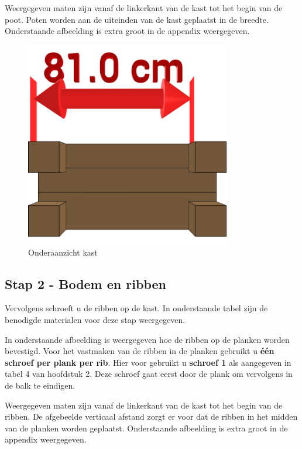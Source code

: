 \documentclass{article}
\begin{document}
Weergegeven maten zijn vanaf de linkerkant van de kast tot het begin van de poot. Poten worden aan de uiteinden van de kast geplaatst in de breedte. Onderstaande afbeelding is extra groot in de appendix weergegeven.

\begin{figure}[h!]
    \centering
    \includegraphics[width=0.8\textwidth]{scene 1 - bottom.png}
    \caption{Onderaanzicht kast}
    \label{fig:stap 1}
\end{figure}

\clearpage
\newpage

\subsection{Stap 2 - Bodem en ribben}

Vervolgens schroeft u de ribben op de kast. In onderstaande tabel zijn de benodigde materialen voor deze stap weergegeven.



In onderstaande afbeelding is weergegeven hoe de ribben op de planken worden bevestigd. Voor het vastmaken van de ribben in de planken gebruikt u \textbf{\'{e}\'{e}n schroef per plank per rib}. Hier voor gebruikt u \textbf{schroef 1} als aangegeven in tabel 4 van hoofdstuk 2. Deze schroef gaat eerst door de plank om vervolgens in de balk te eindigen.

Weergegeven maten zijn vanaf de linkerkant van de kast tot het begin van de ribben. De afgebeelde verticaal afstand zorgt er voor dat de ribben in het midden van de planken worden geplaatst. Onderstaande afbeelding is extra groot in de appendix weergegeven.
\end{document}
